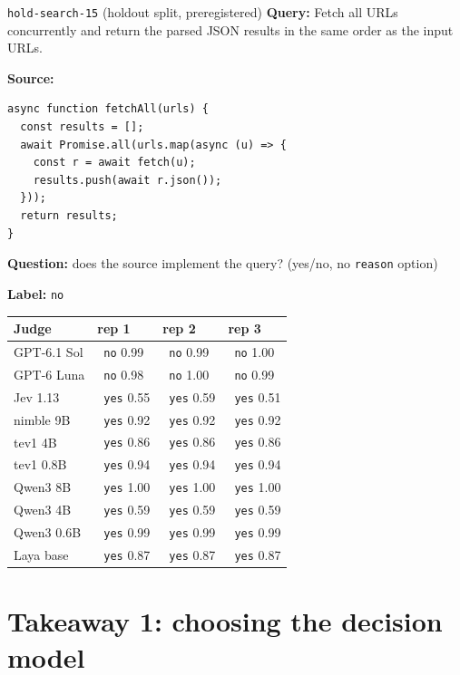 \documentclass[11pt,letterpaper]{article}
\newcommand{\symok}{\textcolor{okgreen}{\ding{51}}}
\newcommand{\symbad}{\textcolor{okorange}{\ding{55}}}
\begin{document}
\begin{casecard}{\texttt{hold-search-15} (holdout split, preregistered)}
\textbf{Query:} Fetch all URLs concurrently and return the parsed JSON results in the same order as the input URLs.\par\smallskip
\textbf{Source:}\par
\begin{lstlisting}
async function fetchAll(urls) {
  const results = [];
  await Promise.all(urls.map(async (u) => {
    const r = await fetch(u);
    results.push(await r.json());
  }));
  return results;
}
\end{lstlisting}
\textbf{Question:} does the source implement the query? (yes/no, no \texttt{reason} option)\par
\textbf{Label:} \texttt{no}\par\smallskip
{\small\begin{tabular*}{\linewidth}{@{\extracolsep{\fill}}l l l l@{}}\toprule
Judge & rep 1 & rep 2 & rep 3 \\ \midrule
GPT-6.1 Sol & \symok\ \texttt{no} 0.99 & \symok\ \texttt{no} 0.99 & \symok\ \texttt{no} 1.00 \\
GPT-6 Luna & \symok\ \texttt{no} 0.98 & \symok\ \texttt{no} 1.00 & \symok\ \texttt{no} 0.99 \\
Jev 1.13 & \symbad\ \texttt{yes} 0.55 & \symbad\ \texttt{yes} 0.59 & \symbad\ \texttt{yes} 0.51 \\
nimble 9B & \symbad\ \texttt{yes} 0.92 & \symbad\ \texttt{yes} 0.92 & \symbad\ \texttt{yes} 0.92 \\
tev1 4B & \symbad\ \texttt{yes} 0.86 & \symbad\ \texttt{yes} 0.86 & \symbad\ \texttt{yes} 0.86 \\
tev1 0.8B & \symbad\ \texttt{yes} 0.94 & \symbad\ \texttt{yes} 0.94 & \symbad\ \texttt{yes} 0.94 \\
Qwen3 8B & \symbad\ \texttt{yes} 1.00 & \symbad\ \texttt{yes} 1.00 & \symbad\ \texttt{yes} 1.00 \\
Qwen3 4B & \symbad\ \texttt{yes} 0.59 & \symbad\ \texttt{yes} 0.59 & \symbad\ \texttt{yes} 0.59 \\
Qwen3 0.6B & \symbad\ \texttt{yes} 0.99 & \symbad\ \texttt{yes} 0.99 & \symbad\ \texttt{yes} 0.99 \\
Laya base & \symbad\ \texttt{yes} 0.87 & \symbad\ \texttt{yes} 0.87 & \symbad\ \texttt{yes} 0.87 \\
\bottomrule\end{tabular*}}
\end{casecard}
\section{Takeaway 1: choosing the decision model}\label{sec:b}
\end{document}
